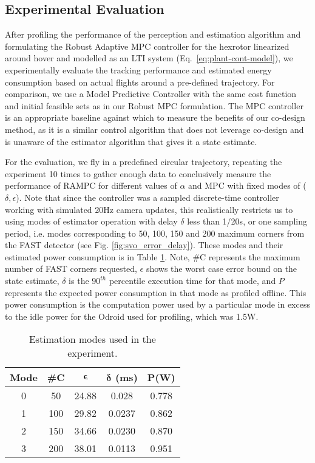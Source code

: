 \subsection{Experimental Evaluation}

After profiling the performance of the perception and estimation algorithm and formulating the Robust Adaptive MPC controller for the hexrotor linearized around hover and modelled as an LTI system (Eq.~\ref{eq:plant-cont-model}), we experimentally evaluate the tracking performance and estimated energy consumption based on actual flights around a pre-defined trajectory. 
For comparison, we use a Model Predictive Controller with the same cost function and initial feasible sets as in our Robust MPC formulation. 
The MPC controller is an appropriate baseline against which to measure the benefits of our co-design method, as it is a similar control algorithm that does not leverage co-design and is unaware of the estimator algorithm that gives it a state estimate. 

For the evaluation, we fly in a predefined circular trajectory, repeating the experiment 10 times to gather enough data to conclusively measure the performance of RAMPC for different values of $\alpha$ and MPC with fixed modes of ($\delta,\epsilon$). 
Note that since the controller was a sampled discrete-time controller working with simulated 20Hz camera updates, this realistically restricts us to using modes of estimator operation with delay $\delta$ less than 1/20s, or one sampling period, i.e. modes corresponding to 50, 100, 150 and 200 maximum corners from the FAST detector (see Fig. \ref{fig:svo_error_delay}). 
These modes and their estimated power consumption is in Table \ref{tbl:modes_exp}. 
Note, \#C represents the maximum number of FAST corners requested, $\epsilon$ shows the worst case error bound on the state estimate, $\delta$ is the $90^{th}$ percentile execution time for that mode, and $P$ represents the expected power consumption in that mode as profiled offline. 
This power consumption is the computation power used by a particular mode in excess to the idle power for the Odroid used for profiling, which was 1.5W.

\begin{table}[htb]
\begin{center}
\caption{Estimation modes used in the experiment.}
\label{tbl:modes_exp}
\begin{tabular} {|c|c|c|c|c|}
	\hline
	\textbf{Mode} & \textbf{\#C} & $\pmb{\epsilon}$ & $\pmb{\delta}$ \textbf{(ms)} & $\pmb{P}$\textbf{(W)} \\ \hline
	0 & 50 &  24.88 & 0.028 &  0.778  \\ \hline
 	1 & 100 & 29.82 & 0.0237 &  0.862  \\ \hline
	2 & 150 & 34.66 & 0.0230 & 0.870 \\ \hline
	3 & 200 & 38.01 & 0.0113 & 0.951 \\ \hline
	\end{tabular}	
	\end{center}
\end{table}



